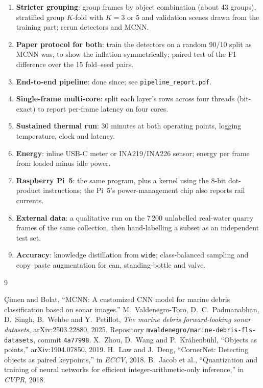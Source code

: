 \documentclass[11pt,a4paper]{article}
\newcommand{\cfg}[1]{\texttt{#1}}
\begin{document}
\begin{enumerate}
  \item \textbf{Stricter grouping}: group frames by object combination
        (about 43 groups), stratified group $K$-fold with $K = 3$ or 5 and
        validation scenes drawn from the training part; rerun detectors and
        MCNN.
  \item \textbf{Paper protocol for both}: train the detectors on a random
        90/10 split as MCNN was, to show the inflation symmetrically; paired
        test of the F1 difference over the 15 fold--seed pairs.
  \item \textbf{End-to-end pipeline}: done since; see
        \texttt{pipeline\_report.pdf}.
  \item \textbf{Single-frame multi-core}: split each layer's rows across
        four threads (bit-exact) to report per-frame latency on four cores.
  \item \textbf{Sustained thermal run}: 30 minutes at both operating
        points, logging temperature, clock and latency.
  \item \textbf{Energy}: inline USB-C meter or INA219/INA226 sensor;
        energy per frame from loaded minus idle power.
  \item \textbf{Raspberry Pi~5}: the same program, plus a kernel using the
        8-bit dot-product instructions; the Pi~5's power-management chip
        also reports rail currents.
  \item \textbf{External data}: a qualitative run on the 7\,200 unlabelled
        real-water quarry frames of the same collection, then hand-labelling a
        subset as an independent test set.
  \item \textbf{Accuracy}: knowledge distillation from \cfg{wide};
        class-balanced sampling and copy--paste augmentation for can,
        standing-bottle and valve.
\end{enumerate}

\begin{thebibliography}{9}\raggedright
{} \c{C}imen and Bolat, ``MCNN: A customized CNN model for marine debris classification based on sonar images.''
 M.~Valdenegro-Toro, D.~C.~Padmanabhan, D.~Singh, B.~Wehbe and Y.~Petillot,
  \emph{The marine debris forward-looking sonar datasets}, arXiv:2503.22880, 2025.
  Repository \texttt{mvaldenegro/marine-debris-fls-datasets}, commit \texttt{4a77998}.
 X.~Zhou, D.~Wang and P.~Kr\"ahenb\"uhl, ``Objects as points,'' arXiv:1904.07850, 2019.
 H.~Law and J.~Deng, ``CornerNet: Detecting objects as paired keypoints,'' in \emph{ECCV}, 2018.
 B.~Jacob et al., ``Quantization and training of neural networks for efficient integer-arithmetic-only inference,'' in \emph{CVPR}, 2018.
\end{thebibliography}
\end{document}
